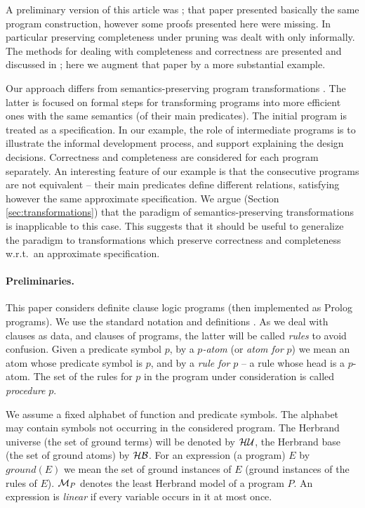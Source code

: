 \documentclass{tlp}
\newcommand*{\HU}{{\ensuremath{\cal{H U}}}\xspace}
\newcommand*{\HB}{{\ensuremath{\cal{H B}}}\xspace}
\newcommand*{\M}{{\ensuremath{\cal M}}\xspace}
\begin{document}
A preliminary version of this article was \cite{drabent12.iclp};
that paper presented basically the same program construction, however 
some proofs presented here were missing.  In particular preserving
completeness under pruning was dealt with only informally.
The methods for dealing with completeness and correctness are presented and
discussed in \cite{drabent.tocl16}; 
here we augment that paper by a more substantial example.






Our approach differs from semantics-preserving program transformations 
 \cite[and the references therein]{PettorossiPS10shorter}.
The latter is focused on formal steps for transforming programs into more
efficient ones with the same semantics (of their main predicates).
The initial program is treated as a specification.
In our example, the role of intermediate programs is to illustrate the
informal development process, and support explaining the design decisions.
Correctness and completeness are considered for each program separately.
An interesting feature of our example is that the consecutive programs
are not equivalent -- their main predicates define different
relations, satisfying however the same approximate specification.
We argue
(Section \ref{sec:transformations})
that the paradigm of semantics-preserving transformations is inapplicable
to this case.
This suggests that it should be useful to generalize the paradigm 
to transformations which preserve
correctness and completeness w.r.t.\ an approximate specification.




\paragraph{Preliminaries.}
This paper considers definite clause logic programs
(then implemented as Prolog programs).
We use the standard notation and definitions \cite{Apt-Prolog}.
As we deal with clauses as data, and clauses of programs, the latter will be
called {\em rules} to avoid confusion.
Given a predicate symbol $p$, by a {\em $p$-atom} (or {\em atom for} $p$)
 we mean an atom whose
predicate symbol is $p$, and by a {\em rule for} $p$ -- a rule whose head
is a $p$-atom.
The set of the rules for $p$ in the program under consideration is called
{\em procedure} $p$.








We assume a fixed alphabet of function and predicate symbols.
The alphabet may contain symbols not occurring in the considered program.
The Herbrand universe (the set of ground terms) will be denoted by \HU, the
Herbrand base (the set of ground atoms) by \HB. 
For an expression (a program) $E$
by $ground(E)$ we mean the set of ground instances
of $E$ (ground instances of the rules of $E$).
$\M_P$ denotes the least Herbrand model of a program $P$.
An expression is {\em linear} if every variable occurs in it at most once.
\end{document}
